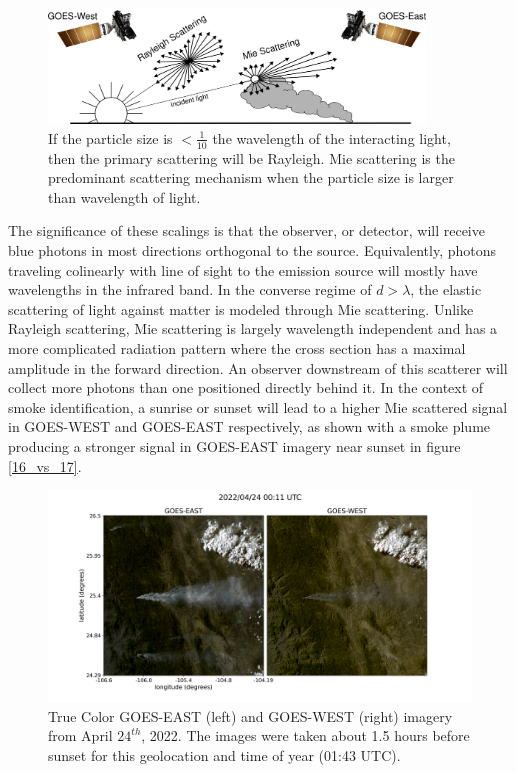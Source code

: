 \documentclass{article}
\begin{document}
\begin{figure}
    \centering
    \includegraphics[width=10cm]{figures/mei.png}
    \caption{If the particle size is \(<\frac{1}{10}\) the wavelength of the interacting light, then the primary scattering will be Rayleigh. Mie scattering is the predominant scattering mechanism when the particle size is larger than wavelength of light.} \label{mei}
\end{figure}

The significance of these scalings is that the observer, or detector, will receive blue photons in most directions orthogonal to the source. Equivalently, photons traveling colinearly with line of sight to the emission source will mostly have wavelengths in the infrared band.  In the converse regime of \(d > \lambda\), the elastic scattering of light against matter is modeled through Mie scattering. Unlike Rayleigh scattering, Mie scattering is largely wavelength independent and has a more complicated radiation pattern where the cross section has a maximal amplitude in the forward direction. An observer downstream of this scatterer will collect more photons than one positioned directly behind it. In the context of smoke identification, a sunrise or sunset will lead to a higher Mie scattered signal in GOES-WEST and GOES-EAST respectively, as shown with a smoke plume producing a stronger signal in GOES-EAST imagery near sunset in figure \ref{16_vs_17}.

\begin{figure}\label{16_vs_17}
    \centering
    \includegraphics[width=15cm]{figures/G16_v_G17.png}
    \caption{True Color GOES-EAST (left) and GOES-WEST (right) imagery from April \(24^{th}\), 2022. The images were taken about 1.5 hours before sunset for this geolocation and time of year (01:43 UTC).}\label{16vs17}
\end{figure}
\end{document}
